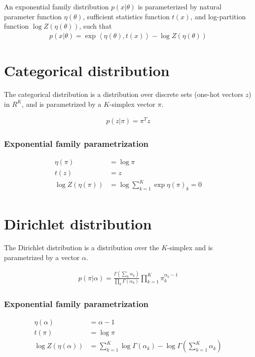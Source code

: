An exponential family distribution $p(x | \theta)$
is parameterized by 
natural parameter function $\eta(\theta)$,
sufficient statistics function $t(x)$,
and log-partition function  $\log Z(\eta(\theta))$,
such that
\begin{align*}
    p(x | \theta) = \exp{\left\langle\eta(\theta), t(x)\right\rangle - \log Z(\eta(\theta))}
\end{align*}

\section{Categorical distribution}
\label{sec:stats-categorical}
The categorical distribution is a distribution
over discrete sets (one-hot vectors $z$) in $R^K$,
and is parametrized by a $K$-simplex vector $\pi$.

\begin{align*}
    p(z | \pi) = \pi^Tz
\end{align*}
\subsubsection*{Exponential family parametrization}
\begin{align*}
    \eta(\pi) &= \log \pi \\
    t(z) &= z \\
    \log Z(\eta(\pi)) &= \log\sum_{k = 1}^K \exp{\eta(\pi)_k} = 0\\
\end{align*}

\section{Dirichlet distribution}
\label{sec:stats-dirichlet}
The Dirichlet distribution is a distribution
over the $K$-simplex
and is parametrized by a vector $\alpha$.

\begin{align*}
    p(\pi | \alpha) = \frac{\Gamma\left(\sum_k \alpha_k\right)}{\prod_k\Gamma(\alpha_k)}\prod_{k = 1}^K \pi_k^{\alpha_k - 1}
\end{align*}

\subsubsection*{Exponential family parametrization}
\begin{align*}
    \eta(\alpha) &= \alpha - 1\\
    t(\pi) &= \log \pi \\
    \log Z(\eta(\alpha)) &= \sum_{k = 1}^K \log \Gamma(\alpha_k) - \log \Gamma\left(\sum_{k = 1}^K \alpha_k\right)
\end{align*}

